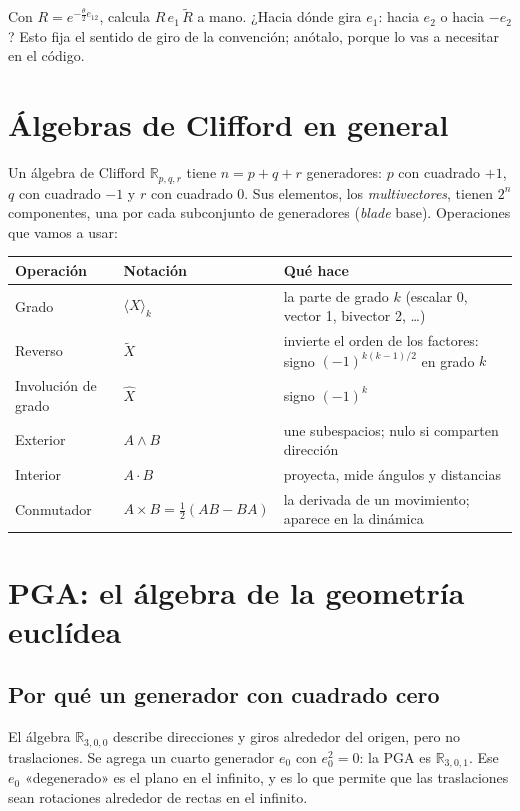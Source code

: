 \documentclass[11pt,a4paper]{article}
\numberwithin{equation}{section}
\newcommand{\rev}[1]{\widetilde{#1}}
\begin{document}
\begin{ejercicio}{0.2}
Con $R = e^{-\frac{\theta}{2}e_{12}}$, calcula $R\,e_1\,\rev R$ a mano. ¿Hacia dónde gira $e_1$: hacia $e_2$ o hacia
$-e_2$? Esto fija el sentido de giro de la convención; anótalo, porque lo vas a necesitar en el código.
\end{ejercicio}

\section{Álgebras de Clifford en general}

Un álgebra de Clifford $\mathbb{R}_{p,q,r}$ tiene $n = p + q + r$ generadores: $p$ con cuadrado $+1$, $q$ con
cuadrado $-1$ y $r$ con cuadrado $0$. Sus elementos, los \emph{multivectores}, tienen $2^n$ componentes, una por cada
subconjunto de generadores (\emph{blade} base). Operaciones que vamos a usar:

\begin{tabularx}{\linewidth}{@{}l l Y@{}}
\toprule
\textbf{Operación} & \textbf{Notación} & \textbf{Qué hace}\\
\midrule
Grado & $\langle X\rangle_k$ & la parte de grado $k$ (escalar 0, vector 1, bivector 2, \dots)\\
Reverso & $\rev X$ & invierte el orden de los factores: signo $(-1)^{k(k-1)/2}$ en grado $k$\\
Involución de grado & $\hat X$ & signo $(-1)^k$\\
Exterior & $A\wedge B$ & une subespacios; nulo si comparten dirección\\
Interior & $A\cdot B$ & proyecta, mide ángulos y distancias\\
Conmutador & $A\times B = \tfrac12(AB - BA)$ & la derivada de un movimiento; aparece en la dinámica\\
\bottomrule
\end{tabularx}

\section{PGA: el álgebra de la geometría euclídea}

\subsection{Por qué un generador con cuadrado cero}
El álgebra $\mathbb{R}_{3,0,0}$ describe direcciones y giros alrededor del origen, pero no traslaciones. Se agrega un
cuarto generador $e_0$ con $e_0^2 = 0$: la PGA es $\mathbb{R}_{3,0,1}$. Ese $e_0$ «degenerado» es el plano en el
infinito, y es lo que permite que las traslaciones sean rotaciones alrededor de rectas en el infinito.
\end{document}
